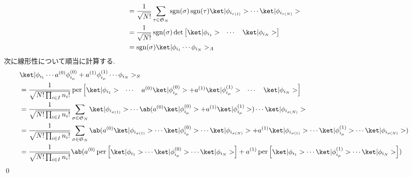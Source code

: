\documentclass[uplatex,dvipdfmx,a4paper,11pt]{jlreq}
\makeatletter
\DeclareMathOperator{\sgn}{sgn}
\DeclareMathOperator{\per}{per}
\renewcommand{\SS}{\mathfrak{S}}
\numberwithin{equation}{section}
\theoremstyle{definition}
\renewenvironment{proof}[1][\proofname]{\par
  \normalfont
  \topsep6\p@\@plus6\p@ \trivlist
  \item[\hskip\labelsep{\bfseries #1}\@addpunct{\bfseries}]\ignorespaces\quad\par
}{%
  \qed\endtrivlist\@endpefalse
}
\renewcommand\proofname{証明}
\makeatother
\begin{document}
\begin{proof}
\begin{align}
                                                           & = \frac{1}{\sqrt{N!}}\sum_{\tau\in\SS_N}\sgn(\sigma)\sgn(\tau)\ket|\phi_{i_{\tau(1)}}>\cdots\ket|\phi_{i_{\tau(N)}}>                                    \\
                                                           & = \frac{1}{\sqrt{N!}}\sgn(\sigma)\det\begin{bmatrix}\ket|\phi_{i_1}> & \cdots & \ket|\phi_{i_N}>\end{bmatrix}                                           \\
                                                           & = \sgn(\sigma)\ket|\phi_{i_1}\cdots\phi_{i_N}>_A
  \end{align}
  次に線形性について順当に計算する.
  \begin{align}
     & \ket|\phi_{i_1}\cdots a^{(0)}\phi_{i_\mu}^{(0)} + a^{(1)}\phi_{i_\mu}^{(1)}\cdots\phi_{i_N}>_S                                                                                                                                                                        \\
     & = \frac{1}{\sqrt{N!\prod_{i\in I}n_i!}}\per\begin{bmatrix}\ket|\phi_{i_1}> & \cdots & a^{(0)}\ket|\phi_{i_\mu}^{(0)}> + a^{(1)}\ket|\phi_{i_\mu}^{(1)}> & \cdots & \ket|\phi_{i_N}>\end{bmatrix}                                                                      \\
     & = \frac{1}{\sqrt{N!\prod_{i\in I}n_i!}}\sum_{\sigma\in\SS_N}\ket|\phi_{i_{\sigma(1)}}>\cdots\ab(a^{(0)}\ket|\phi_{i_\mu}^{(0)}> + a^{(1)}\ket|\phi_{i_\mu}^{(1)}>)\cdots\ket|\phi_{i_{\sigma(N)}}>                                                                    \\
     & = \frac{1}{\sqrt{N!\prod_{i\in I}n_i!}}\sum_{\sigma\in\SS_N}\ab(a^{(0)}\ket|\phi_{i_{\sigma(1)}}>\cdots\ket|\phi_{i_\mu}^{(0)}>\cdots\ket|\phi_{i_{\sigma(N)}}> + a^{(1)}\ket|\phi_{i_{\sigma(1)}}>\cdots\ket|\phi_{i_\mu}^{(1)}>\cdots\ket|\phi_{i_{\sigma(N)}}>)    \\
     & = \frac{1}{\sqrt{N!\prod_{i\in I}n_i!}}\ab(a^{(0)}\per\begin{bmatrix}\ket|\phi_{i_1}>\cdots\ket|\phi_{i_\mu}^{(0)}>\cdots\ket|\phi_{i_N}>\end{bmatrix} + a^{(1)}\per\begin{bmatrix}\ket|\phi_{i_1}>\cdots\ket|\phi_{i_\mu}^{(1)}>\cdots\ket|\phi_{i_N}>\end{bmatrix}) \\

\end{align}
\end{proof}
\end{document}
